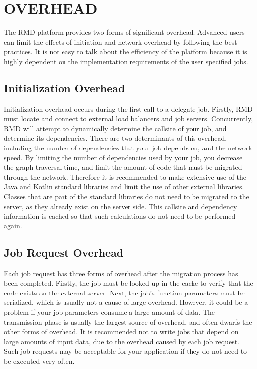 \section{OVERHEAD}\label{sec:overhead}

The RMD platform provides two forms of significant overhead.
Advanced users can limit the effects of initiation and network
overhead by following the best practices.
It is not easy to talk about the efficiency of the platform
because it is highly dependent on the implementation requirements
of the user specified jobs.

\subsection{Initialization Overhead}\label{subsec:initializationOverhead}

Initialization overhead occurs during the first call to a delegate job.
Firstly, RMD must locate and connect to external load balancers and
job servers.
Concurrently, RMD will attempt to dynamically determine the callsite
of your job, and determine its dependencies.
There are two determinants of this overhead, including the
number of dependencies that your job depends on, and the network
speed.
By limiting the number of dependencies used by your job,
you decrease the graph traversal time, and limit the amount
of code that must be migrated through the network.
Therefore it is recommended to make extensive use of the Java and Kotlin
standard libraries and limit the use of other external libraries.
Classes that are part of the standard libraries do not need to be migrated
to the server, as they already exist on the server side.
This callsite and dependency information is cached so that such calculations
do not need to be performed again.


\subsection{Job Request Overhead}\label{subsec:networkOverhead}

Each job request has three forms of overhead after the migration
process has been completed.
Firstly, the job must be looked up in the cache to verify
that the code exists on the external server.
Next, the job's function parameters must be serialized, which
is usually not a cause of large overhead. However, it could be a problem
if your job parameters consume a large amount of data.
The transmission phase is usually the largest source of overhead,
and often dwarfs the other forms of overhead.
It is recommended not to write jobs that depend on large amounts
of input data, due to the overhead caused by each job request.
Such job requests may be acceptable for your application if they do
not need to be executed very often.
